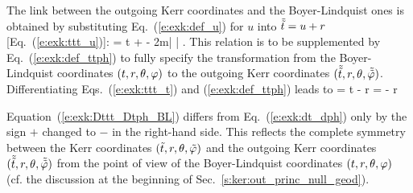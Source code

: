 The link between the outgoing Kerr coordinates and the Boyer-Lindquist ones
is obtained by substituting Eq.~(\ref{e:exk:def_u}) for $u$ into $\tilde{{\tilde t}} = u + r$
[Eq.~(\ref{e:exk:ttt_u})]:
\be \label{e:exk:ttt_t}
    \tilde{\ti} = t +  - 2m\ln\left|  \right| .
\ee
This relation is to be supplemented by Eq.~(\ref{e:exk:def_ttph}) to fully
specify the transformation from the Boyer-Lindquist coordinates
$(t,r,\theta,\varphi)$ to the outgoing Kerr coordinates
$(\tilde{{\tilde t}},r,\theta,\tilde{{\tilde\varphi}})$.
Differentiating Eqs.~(\ref{e:exk:ttt_t}) and (\ref{e:exk:def_ttph})
leads to
\be \label{e:exk:Dttt_Dtph_BL}
    \D\tilde{\ti} = \D t -  \D r
    \qand
    \D\tilde{\tph} = \D\ph -  \D r
\ee
\begin{remark}
Equation~(\ref{e:exk:Dttt_Dtph_BL}) differs from
Eq.~(\ref{e:exk:dt_dph}) only by the sign $+$ changed to $-$ in the
right-hand side. This reflects the complete symmetry between the Kerr coordinates
$({\tilde t},r,\theta,{\tilde\varphi})$
and the outgoing Kerr coordinates
$(\tilde{{\tilde t}},r,\theta,\tilde{{\tilde\varphi}})$
from the point of view of the Boyer-Lindquist coordinates $(t,r,\theta,\varphi)$
(cf. the discussion at the beginning of Sec.~\ref{s:ker:out_princ_null_geod}).
\end{remark}


